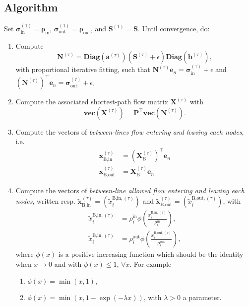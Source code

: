 \documentclass[11p]{article}
\begin{document}
\subsection{Algorithm}
Set $\bm{\sigma}^{(1)}_\text{in} = \bm{\rho}_\text{in}$, $\bm{\sigma}^{(1)}_\text{out} = \bm{\rho}_\text{out}$, and $\mathbf{S}^{(1)} = \mathbf{S}$. Until convergence, do:
\begin{enumerate}
	\item Compute 
	\begin{equation}
		\mathbf{N}^{(\tau)} = \textbf{Diag}(\mathbf{a}^{(\tau)}) (\mathbf{S}^{(\tau)} + \epsilon)\textbf{Diag}(\mathbf{b}^{(\tau)}),
	\end{equation}
	with proportional iterative fitting, such that $\mathbf{N}^{(\tau)} \mathbf{e}_n = \bm{\sigma}^{(\tau)}_\text{in} + \epsilon$ and $\left(\mathbf{N}^{(\tau)}\right)^\top \mathbf{e}_n = \bm{\sigma}^{(\tau)}_\text{out}  + \epsilon$.
	
	\item Compute the associated shortest-path flow matrix $\mathbf{X}^{(\tau)}$ with
	\begin{equation}
		\textbf{vec}(\mathbf{X}^{(\tau)}) = \mathbf{P}^\top \textbf{vec}(\mathbf{N}^{(\tau)}).
	\end{equation}
	
	\item Compute the vectors of \emph{between-lines flow entering and leaving each nodes}, i.e.
	\begin{align}
		\mathbf{x}^{(\tau)}_\text{B,in} &= (\mathbf{X}^{(\tau)}_\text{B})^\top \mathbf{e}_n \\
		\mathbf{x}^{(\tau)}_\text{B,out} &= \mathbf{X}^{(\tau)}_\text{B} \mathbf{e}_n
	\end{align}

	\item Compute the vectors of \emph{between-line allowed flow entering and leaving each nodes}, written resp. $\tilde{\mathbf{x}}^{(\tau)}_\text{B,in} = (\tilde{x}^{\text{B,in},(\tau)}_i)$ and $\tilde{\mathbf{x}}^{(\tau)}_\text{B,out} = (\tilde{x}^{\text{B,out},(\tau)}_i)$, with 
	\begin{align}
		\tilde{x}^{\text{B,in},(\tau)}_i &= \rho_i^\text{in} \phi \left( \frac{x^{\text{B,in},(\tau)}_i}{\rho_i^\text{in}} \right), \\
		\tilde{x}^{\text{B,in},(\tau)}_i &= \rho_i^\text{out} \phi \left( \frac{x^{\text{B,out},(\tau)}_i}{\rho_i^\text{out}} \right),
	\end{align}
	where $\phi(x)$ is a positive increasing function which should be the identity when $x \to 0$ and with $\phi(x) \leq 1$, $\forall x$. For example
	\begin{enumerate}
		\item $\phi(x) = \min(x, 1)$,
		\item $\phi(x) = \min(x, 1 - \exp(-\lambda x))$, with $\lambda > 0$ a parameter.
	\end{enumerate}


\end{enumerate}
\end{document}
